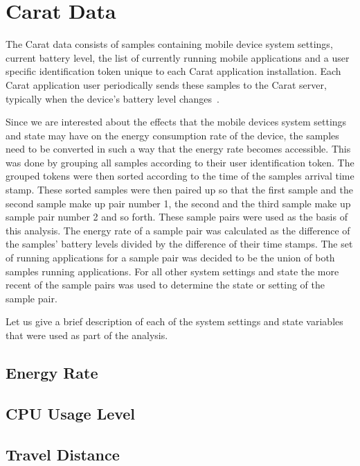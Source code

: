 \section{Carat Data}

The Carat data consists of samples containing mobile device system settings, current battery level, the list of currently running mobile applications and a user specific identification token unique to each Carat application installation. Each Carat application user periodically sends these samples to the Carat server, typically when the device's battery level changes~\cite{Oliner:2013:CCE:2517351.2517354}. 

Since we are interested about the effects that the mobile devices system settings and state may have on the energy consumption rate of the device, the samples need to be converted in such a way that the energy rate becomes accessible. This was done by grouping all samples according to their user identification token. The grouped tokens were then sorted according to the time of the samples arrival time stamp. These sorted samples were then paired up so that the first sample and the second sample make up pair number 1, the second and the third sample make up sample pair number 2 and so forth. These sample pairs were used as the basis of this analysis. The energy rate of a sample pair was calculated as the difference of the samples' battery levels divided by the difference of their time stamps. The set of running applications for a sample pair was decided to be the union of both samples running applications. For all other system settings and state the more recent of the sample pairs was used to determine the state or setting of the sample pair.

Let us give a brief description of each of the system settings and state variables that were used as part of the analysis.   

\subsection{Energy Rate} 

\subsection{CPU Usage Level}  

\subsection{Travel Distance}  

